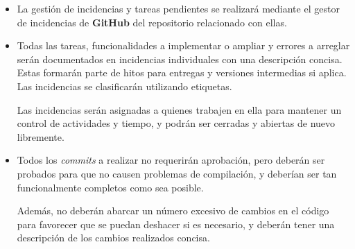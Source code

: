 \documentclass[11pt, a4paper, titlepage]{article}
\begin{document}
\begin{itemize}
\begin{itemize}
        \item Un repositorio para el \textit{frontend} de \textbf{React}\footnote{\href{https://github.com/UNIZAR-30226-2022-01/proyecto_software_frontend_react}{}}, en el cual se localizará todo el código y ficheros para el despliegue relativo al frontend de \textbf{React}.
        
        \item Un repositorio para el \textit{frontend} de \textbf{Angular}\footnote{\href{https://github.com/UNIZAR-30226-2022-01/proyecto_software_frontend_angular}{\color{blue}{Repositorio del frontend de Angular}}}, en el cual se localizará todo el código y ficheros para el despliegue relativo al frontend de \textbf{Angular}.
        
        \item Un repositorio para la documentación pública\footnote{\href{https://github.com/UNIZAR-30226-2022-01/proyecto_software_documentacion}{\color{blue}{Repositorio de documentación pública}}}, en el cual se localizarán todos los archivos de documentación interna o para los clientes finales y parciales, como archivos de \LaTeX.
    \end{itemize}
    
    \item La gestión de incidencias y tareas pendientes se realizará mediante el gestor de incidencias de \textbf{GitHub} del repositorio relacionado con ellas.
    
    \item Todas las tareas, funcionalidades a implementar o ampliar y errores a arreglar serán documentados en incidencias individuales con una descripción concisa. Estas formarán parte de hitos para entregas y versiones intermedias si aplica. Las incidencias se clasificarán utilizando etiquetas.
    
    Las incidencias serán asignadas a quienes trabajen en ella para mantener un control de actividades y tiempo, y podrán ser cerradas y abiertas de nuevo libremente.
    
    \item Todos los \textit{commits} a realizar no requerirán aprobación, pero deberán ser probados para que no causen problemas de compilación, y deberían ser tan funcionalmente completos como sea posible. 
    
    Además, no deberán abarcar un número excesivo de cambios en el código para favorecer que se puedan deshacer si es necesario, y deberán tener una descripción de los cambios realizados concisa.
    
    
\end{itemize}
\end{document}
